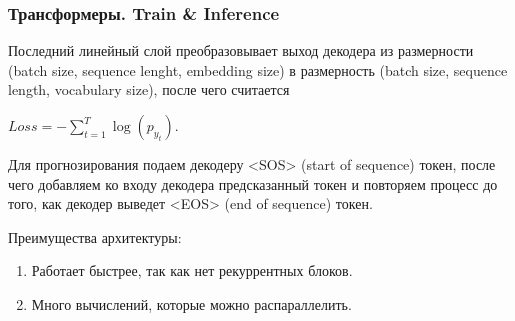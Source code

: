 \documentclass[notheorems, handout]{beamer}
\begin{document}
	\begin{frame}
	\frametitle{Трансформеры. Train \& Inference}
		Последний линейный слой преобразовывает выход декодера из размерности (batch size, sequence lenght, embedding size) в размерность (batch size, sequence length, vocabulary size), после чего считается 
		
		$Loss = -\sum\limits_{t=1}^{T}\log(p_{y_t}).$
		
		Для прогнозирования подаем декодеру <SOS> (start of sequence) токен, после чего добавляем ко входу декодера предсказанный токен и повторяем процесс до того, как декодер выведет <EOS> (end of sequence) токен. 
		\vspace{0.3cm}
		
		Преимущества архитектуры: 
		\begin{enumerate}
			\item Работает быстрее, так как нет рекуррентных блоков.
			\item Много вычислений, которые можно распараллелить. 
		\end{enumerate}
	\end{frame}
	
\end{document}
